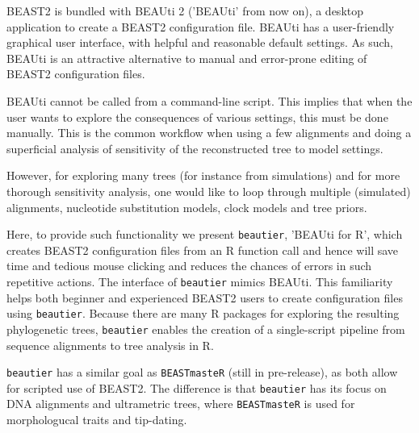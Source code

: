 \documentclass{article}
\begin{document}
BEAST2 is bundled with BEAUti 2 \cite{drummond2012bayesian} ('BEAUti' from now on), 
a desktop application to create a BEAST2 configuration file.
BEAUti has a user-friendly graphical user interface, with helpful and reasonable default settings.
As such, BEAUti is an attractive alternative 
to manual and error-prone editing of BEAST2 configuration files. 

BEAUti cannot be called from a command-line script.
This implies that when the user 
wants to explore the consequences of various settings, this must be done manually.
This is the common workflow when using a few alignments and doing a superficial 
analysis of sensitivity of the reconstructed tree to model settings. 

However, for exploring many trees (for instance from simulations) and for
more thorough sensitivity analysis, one would like to loop through 
multiple (simulated) alignments, nucleotide substitution models, 
clock models and tree priors. 

Here, to provide such functionality we present \verb;beautier;, 
’BEAUti for R’, which creates BEAST2 configuration files 
from an R function call and hence
will save time and tedious mouse clicking and 
reduces the chances of errors in such repetitive actions.
The interface of \verb;beautier; mimics BEAUti. This
familiarity helps both beginner and experienced BEAST2 users 
to create configuration files using \verb;beautier;.
Because there are many R packages for exploring the 
resulting phylogenetic trees, 
\verb;beautier; enables the creation of a single-script 
pipeline from sequence alignments to tree analysis in R. 

\verb;beautier; has a similar goal as \verb;BEASTmasteR; \cite{beastmaster} (still
in pre-release), as both
allow for scripted use of BEAST2. The difference is that \verb;beautier; 
has its focus on DNA alignments and ultrametric trees, 
where \verb;BEASTmasteR; is used for 
morphologucal traits and tip-dating. 
\end{document}
